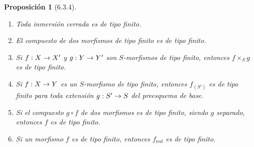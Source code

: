 \documentclass[oneside]{amsart}
\theoremstyle{ega-env-style}
\theoremstyle{ega-thm-env-style}
\newtheorem*{proposition}{Proposición}
\theoremstyle{ega-defn-env-style}
\renewcommand{\to}{\mathchoice{\longrightarrow}{\rightarrow}{\rightarrow}{\rightarrow}}
\let\EGAOriginalLabel\label
\renewcommand{\label}[1]{\phantomsection\EGAOriginalLabel{#1}}
\begin{document}
\begin{proposition}[6.3.4]
\label{I.6.3.4}
\medskip\noindent
\begin{enumerate}
  \item[{\rm(i)}] Toda inmersión cerrada es de tipo finito.
  \item[{\rm(ii)}] El compuesto de dos morfismos de tipo finito es de tipo finito.
  \item[{\rm(iii)}] Si $f:X\to X'$ y $g:Y\to Y'$ son $S$-morfismos de tipo finito, entonces $f\times_S g$ es de tipo finito.
  \item[{\rm(iv)}] Si $f:X\to Y$ es un $S$-morfismo de tipo finito, entonces $f_{(S')}$ es de tipo finito para toda extensión $g:S'\to S$ del preesquema de base.
  \item[{\rm(v)}] Si el compuesto $g\circ f$ de dos morfismos es de tipo finito, siendo $g$ separado, entonces $f$ es de tipo finito.
  \item[{\rm(vi)}] Si un morfismo $f$ es de tipo finito, entonces $f_{\mathrm{red}}$ es de tipo finito.
\end{enumerate}
\end{proposition}
\end{document}
